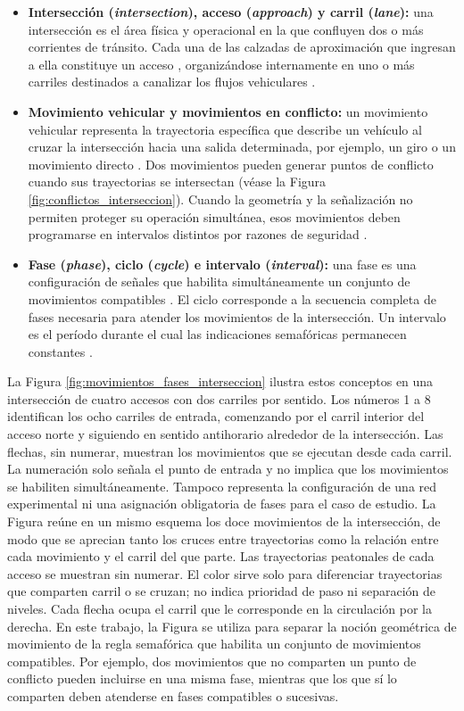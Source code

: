 \begin{itemize}
    \item \textbf{Intersección (\textit{intersection}), acceso (\textit{approach}) y carril (\textit{lane}):} una intersección es el área física y operacional en la que confluyen dos o más corrientes de tránsito. Cada una de las calzadas de aproximación que ingresan a ella constituye un acceso \cite{ite_handbook}, organizándose internamente en uno o más carriles destinados a canalizar los flujos vehiculares \cite{calymayor}.
    \item \textbf{Movimiento vehicular y movimientos en conflicto:} un movimiento vehicular representa la trayectoria específica que describe un vehículo al cruzar la intersección hacia una salida determinada, por ejemplo, un giro o un movimiento directo \cite{WeiH2019ASTSCM}. Dos movimientos pueden generar puntos de conflicto cuando sus trayectorias se intersectan (véase la Figura \ref{fig:conflictos_interseccion}). Cuando la geometría y la señalización no permiten proteger su operación simultánea, esos movimientos deben programarse en intervalos distintos por razones de seguridad \cite{fernandez}.
    \item \textbf{Fase (\textit{phase}), ciclo (\textit{cycle}) e intervalo (\textit{interval}):} una fase es una configuración de señales que habilita simultáneamente un conjunto de movimientos compatibles \cite{ite_handbook}. El ciclo corresponde a la secuencia completa de fases necesaria para atender los movimientos de la intersección. Un intervalo es el período durante el cual las indicaciones semafóricas permanecen constantes \cite{calymayor}.
\end{itemize}

La Figura \ref{fig:movimientos_fases_interseccion} ilustra estos conceptos en una intersección de cuatro accesos con dos carriles por sentido. Los números 1 a 8 identifican los ocho carriles de entrada, comenzando por el carril interior del acceso norte y siguiendo en sentido antihorario alrededor de la intersección. Las flechas, sin numerar, muestran los movimientos que se ejecutan desde cada carril. La numeración solo señala el punto de entrada y no implica que los movimientos se habiliten simultáneamente. Tampoco representa la configuración de una red experimental ni una asignación obligatoria de \glspl{fase} para el caso de estudio. La Figura reúne en un mismo esquema los doce movimientos de la intersección, de modo que se aprecian tanto los cruces entre trayectorias como la relación entre cada movimiento y el carril del que parte. Las trayectorias peatonales de cada acceso se muestran sin numerar. El color sirve solo para diferenciar trayectorias que comparten carril o se cruzan; no indica prioridad de paso ni separación de niveles. Cada flecha ocupa el carril que le corresponde en la circulación por la derecha. En este trabajo, la Figura se utiliza para separar la noción geométrica de movimiento de la regla semafórica que habilita un conjunto de movimientos compatibles. Por ejemplo, dos movimientos que no comparten un punto de conflicto pueden incluirse en una misma fase, mientras que los que sí lo comparten deben atenderse en fases compatibles o sucesivas.

